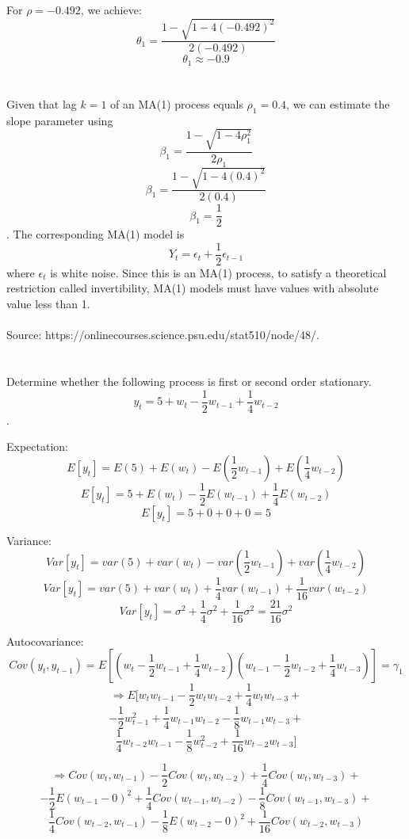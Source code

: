 \documentclass[11pt]{article}
\begin{document}
For $\rho = -0.492$, we achieve:
$$ \theta_1 = \frac{1 - \sqrt{1-4(-0.492)^2}}{2(-0.492)} $$
$$ \theta_1 \approx -0.9 $$

\newpage
\section{}
Given that lag $k = 1$ of an MA(1) process equals $\rho_1 = 0.4$, we can estimate the slope parameter using $$ \beta_1 = \frac{1 -\sqrt{1-4 \rho_1^2}}{2 \rho_1} $$  $$ \beta_1 = \frac{1-\sqrt{1-4 (0.4)^2}}{2(0.4)} $$
$$ \beta_1 = \frac{1}{2} $$. The corresponding MA(1) model is $$ Y_t = \epsilon_t + \frac{1}{2}\epsilon_{t-1} $$ where $\epsilon_t$ is white noise. Since this is an MA(1) process, to satisfy a theoretical restriction called invertibility, MA(1) models must have values with absolute value less than 1.\\\\
Source: https://onlinecourses.science.psu.edu/stat510/node/48/.
\newpage


\section{}
Determine whether the following process is first or second order stationary. $$ y_t = 5 + w_t - \frac{1}{2}w_{t-1} + \frac{1}{4}w_{t-2} $$.

Expectation:
$$ E[y_t] = E(5) + E(w_t) - E(\frac{1}{2}w_{t-1}) + E(\frac{1}{4}w_{t-2}) $$
$$ E[y_t] = 5 + E(w_t) - \frac{1}{2}E(w_{t-1}) + \frac{1}{4}E(w_{t-2}) $$
$$ E[y_t] = 5 + 0 + 0 + 0 = 5 $$

Variance:
$$ Var[y_t] = var(5) + var(w_t) - var(\frac{1}{2}w_{t-1}) + var(\frac{1}{4}w_{t-2}) $$
$$ Var[y_t] = var(5) + var(w_t) + \frac{1}{4}var(w_{t-1}) + \frac{1}{16}var(w_{t-2}) $$
$$ Var[y_t] = \sigma^2 + \frac{1}{4}\sigma^2 + \frac{1}{16}\sigma^2 = \frac{21}{16}\sigma^2 $$

Autocovariance:
$$ Cov(y_t, y_{t-1}) = E[(w_t - \frac{1}{2}w_{t-1} + \frac{1}{4}w_{t-2})(w_{t-1} - \frac{1}{2}w_{t-2} + \frac{1}{4}w_{t-3})] = \gamma_1 $$
$$ \Rightarrow E[w_t w_{t-1} - \frac{1}{2}w_t w_{t-2} + \frac{1}{4}w_t w_{t-3} + $$
$$ -\frac{1}{2}w_{t-1}^2 + \frac{1}{4}w_{t-1} w_{t-2} - \frac{1}{8}w_{t-1}w_{t-3} + $$
$$ \frac{1}{4} w_{t-2}w_{t-1} - \frac{1}{8}w_{t-2}^2 + \frac{1}{16}w_{t-2} w_{t-3} ] $$

$$ \Rightarrow Cov(w_t, w_{t-1}) - \frac{1}{2}Cov(w_t ,w_{t-2}) + \frac{1}{4}Cov(w_t,w_{t-3}) + $$
$$ -\frac{1}{2}E(w_{t-1}-0)^2 + \frac{1}{4}Cov(w_{t-1}, w_{t-2}) - \frac{1}{8}Cov(w_{t-1},w_{t-3}) + $$
$$ \frac{1}{4} Cov(w_{t-2},w_{t-1}) - \frac{1}{8}E(w_{t-2}-0)^2 + \frac{1}{16}Cov(w_{t-2},w_{t-3}) $$
\end{document}
